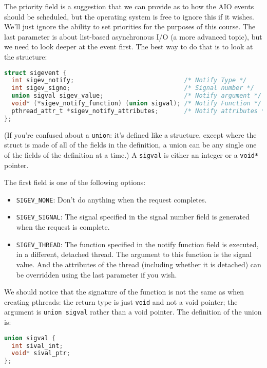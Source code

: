 The priority field is a suggestion that we can provide as to how the AIO events should be scheduled, but the operating system is free to ignore this if it wishes. We'll just ignore the ability to set priorities for the purposes of this course. The last parameter is about list-based asynchronous I/O (a more advanced topic), but we need to look deeper at the event first. The best way to do that is to look at the structure:

\begin{lstlisting}[language=C]
struct sigevent {
  int sigev_notify;                              /* Notify Type */
  int sigev_signo;                               /* Signal number */
  union sigval sigev_value;                      /* Notify argument */
  void* (*sigev_notify_function) (union sigval); /* Notify Function */
  pthread_attr_t *sigev_notify_attributes;       /* Notify attributes */
};
\end{lstlisting}

(If you're confused about a \texttt{union}: it's defined like a structure, except where the struct is made of all of the fields in the definition, a union can be any single one of the fields of the definition at a time.) A \texttt{sigval} is either an integer or a \texttt{void*} pointer.

The first field is one of the following options:
\begin{itemize}
	\item \texttt{SIGEV\_NONE}: Don't do anything when the request completes.
	\item \texttt{SIGEV\_SIGNAL}: The signal specified in the signal number field is generated when the request is complete.
	\item \texttt{SIGEV\_THREAD}: The function specified in the notify function field is executed, in a different, detached thread. The argument to this function is the signal value. And the attributes of the thread (including whether it is detached) can be overridden using the last parameter if you wish.
\end{itemize}

We should notice that the signature of the function is not the same as when creating pthreads: the return type is just \texttt{void} and not a void pointer; the argument is \texttt{union sigval} rather than a void pointer. The definition of the union is:

\begin{lstlisting}[language=C]
union sigval {
  int sival_int;
  void* sival_ptr;
};
\end{lstlisting}

